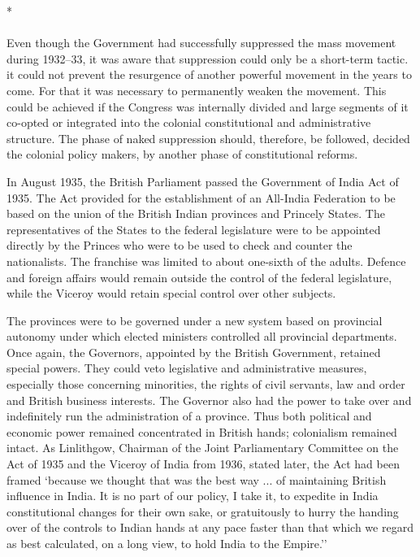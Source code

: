 \begin{center}*\end{center}

\paragraph*{}

Even though the Government had successfully suppressed the mass movement during 1932--33, it was aware that suppression could only be a short-term tactic. it could not prevent the resurgence of another powerful movement in the years to come. For that it was necessary to permanently weaken the movement. This could be achieved if the Congress was internally divided and large segments of it co-opted or integrated into the colonial constitutional and administrative structure. The phase of naked suppression should, therefore, be followed, decided the colonial policy makers, by another phase of constitutional reforms. 

In August 1935, the British Parliament passed the Government of India Act of 1935. The Act provided for the establishment of an All-India Federation to be based on the union of the British Indian provinces and Princely States. The representatives of the States to the federal legislature were to be appointed directly by the Princes who were to be used to check and counter the nationalists. The franchise was limited to about one-sixth of the adults. Defence and foreign affairs would remain outside the control of the federal legislature, while the Viceroy would retain special control over other subjects. 

The provinces were to be governed under a new system based on provincial autonomy under which elected ministers controlled all provincial departments. Once again, the Governors, appointed by the British Government, retained special powers. They could veto legislative and administrative measures, especially those concerning minorities, the rights of civil servants, law and order and British business interests. The Governor also had the power to take over and indefinitely run the administration of a province. Thus both political and economic power remained concentrated in British hands; colonialism remained intact. As Linlithgow, Chairman of the Joint Parliamentary Committee on the Act of 1935 and the Viceroy of India from 1936, stated later, the Act had been framed `because we thought that was the best way ... of maintaining British influence in India. It is no part of our policy, I take it, to expedite in India constitutional changes for their own sake, or gratuitously to hurry the handing over of the controls to Indian hands at any pace faster than that which we regard as best calculated, on a long view, to hold India to the Empire.'' 

